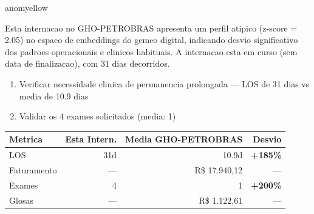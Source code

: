 \documentclass[a4paper,10pt]{article}
\begin{document}
\begin{anomalycard}[Internacao 166280 | GHO-PETROBRAS | MODERADO (z=2.05)]{anomyellow}
\vspace{2pt}\begin{tcolorbox}[colback=severityred!20,colframe=anomyellow,title={\textbf{Interpretacao de Negocio}},fonttitle=\bfseries\small,left=4pt,right=4pt,top=3pt,bottom=3pt]
{\small Esta internacao no GHO-PETROBRAS apresenta um perfil atipico (z-score = 2.05) no espaco de embeddings do gemeo digital, indicando desvio significativo dos padroes operacionais e clinicos habituais. A internacao esta em curso (sem data de finalizacao), com 31 dias decorridos.}
\end{tcolorbox}
\begin{tcolorbox}[colback=severityyellow!30,colframe=anomorange,title={\textbf{Recomendacoes Especificas}},fonttitle=\bfseries\small,left=4pt,right=4pt,top=3pt,bottom=3pt]
\begin{enumerate}[nosep,leftmargin=16pt]
\item {\small Verificar necessidade clinica de permanencia prolongada --- LOS de 31 dias vs media de 10.9 dias}
\item {\small Validar os 4 exames solicitados (media: 1)}
\end{enumerate}
\end{tcolorbox}
\begin{center}\begin{tabular}{l r r r}\toprule\textbf{Metrica} & \textbf{Esta Intern.} & \textbf{Media GHO-PETROBRAS} & \textbf{Desvio} \\\midrule
LOS & 31d & 10.9d & \textcolor{anomred}{\textbf{+185\%}} \\
Faturamento & --- & R\$ 17.940,12 & --- \\
Exames & 4 & 1 & \textcolor{anomred}{\textbf{+200\%}} \\
Glosas & --- & R\$ 1.122,61 & --- \\
\bottomrule\end{tabular}\end{center}


\end{anomalycard}
\end{document}

